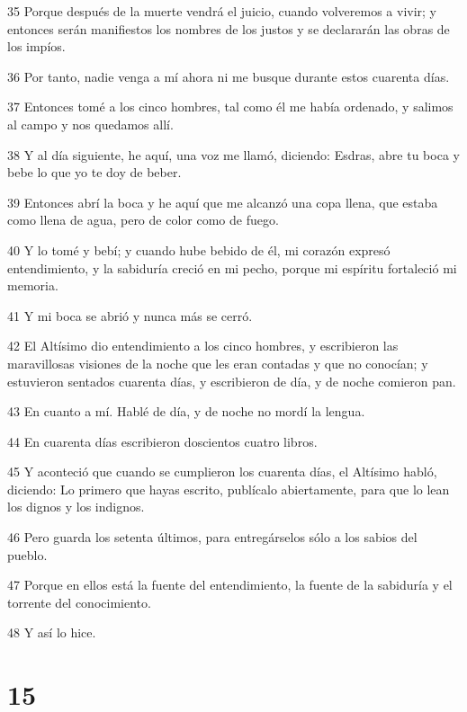 \par 35 Porque después de la muerte vendrá el juicio, cuando volveremos a vivir; y entonces serán manifiestos los nombres de los justos y se declararán las obras de los impíos.
\par 36 Por tanto, nadie venga a mí ahora ni me busque durante estos cuarenta días.
\par 37 Entonces tomé a los cinco hombres, tal como él me había ordenado, y salimos al campo y nos quedamos allí.
\par 38 Y al día siguiente, he aquí, una voz me llamó, diciendo: Esdras, abre tu boca y bebe lo que yo te doy de beber.
\par 39 Entonces abrí la boca y he aquí que me alcanzó una copa llena, que estaba como llena de agua, pero de color como de fuego.
\par 40 Y lo tomé y bebí; y cuando hube bebido de él, mi corazón expresó entendimiento, y la sabiduría creció en mi pecho, porque mi espíritu fortaleció mi memoria.
\par 41 Y mi boca se abrió y nunca más se cerró.
\par 42 El Altísimo dio entendimiento a los cinco hombres, y escribieron las maravillosas visiones de la noche que les eran contadas y que no conocían; y estuvieron sentados cuarenta días, y escribieron de día, y de noche comieron pan.
\par 43 En cuanto a mí. Hablé de día, y de noche no mordí la lengua.
\par 44 En cuarenta días escribieron doscientos cuatro libros.
\par 45 Y aconteció que cuando se cumplieron los cuarenta días, el Altísimo habló, diciendo: Lo primero que hayas escrito, publícalo abiertamente, para que lo lean los dignos y los indignos.
\par 46 Pero guarda los setenta últimos, para entregárselos sólo a los sabios del pueblo.
\par 47 Porque en ellos está la fuente del entendimiento, la fuente de la sabiduría y el torrente del conocimiento.
\par 48 Y así lo hice.

\chapter{15}

